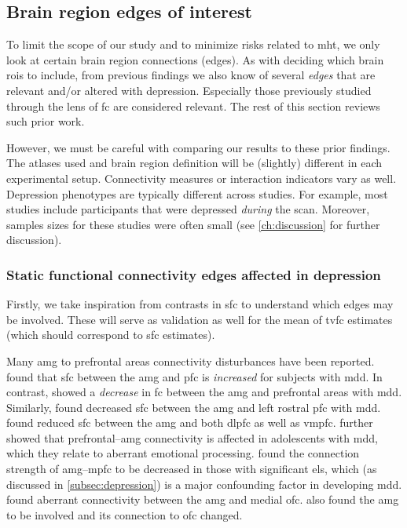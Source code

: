 \subsection{Brain region edges of interest}

To limit the scope of our study and to minimize risks related to \gls{mht}, we only look at certain brain region connections (edges).
As with deciding which brain \glspl{roi} to include, from previous findings we also know of several \emph{edges} that are relevant and/or altered with depression.
Especially those previously studied through the lens of \gls{fc} are considered relevant.
The rest of this section reviews such prior work.

However, we must be careful with comparing our results to these prior findings.
The atlases used and brain region definition will be (slightly) different in each experimental setup.
Connectivity measures or interaction indicators vary as well.
Depression phenotypes are typically different across studies.
For example, most studies include participants that were depressed \emph{during} the scan.
Moreover, samples sizes for these studies were often small (see \cref{ch:discussion} for further discussion).

\subsubsection{Static functional connectivity edges affected in depression}

Firstly, we take inspiration from contrasts in \gls{sfc} to understand which edges may be involved.
These will serve as validation as well for the mean of \gls{tvfc} estimates (which should correspond to \gls{sfc} estimates).

Many \gls{amg} to prefrontal areas connectivity disturbances have been reported.
\textcite{Zhang2020} found that \gls{sfc} between the \gls{amg} and \gls{pfc} is \emph{increased} for subjects with \gls{mdd}.
In contrast, \textcite{Dannlowski2009} showed a \emph{decrease} in \gls{fc} between the \gls{amg} and prefrontal areas with \gls{mdd}.
Similarly, \textcite{Kong2013} found decreased \gls{sfc} between the \gls{amg} and left rostral \gls{pfc} with \gls{mdd}.
\textcite{Connolly2017} found reduced \gls{sfc} between the \gls{amg} and both \gls{dlpfc} as well as \gls{vmpfc}.
\textcite{Willinger2022} further showed that prefrontal--\gls{amg} connectivity is affected in adolescents with \gls{mdd}, which they relate to aberrant emotional processing.
\textcite{Burghy2012} found the connection strength of \gls{amg}--\gls{mpfc} to be decreased in those with significant \gls{els}, which (as discussed in \cref{subsec:depression}) is a major confounding factor in developing \gls{mdd}.
\textcite{Rolls2020} found aberrant connectivity between the \gls{amg} and medial \gls{ofc}.
\textcite{Tang2018} also found the \gls{amg} to be involved and its connection to \gls{ofc} changed.

